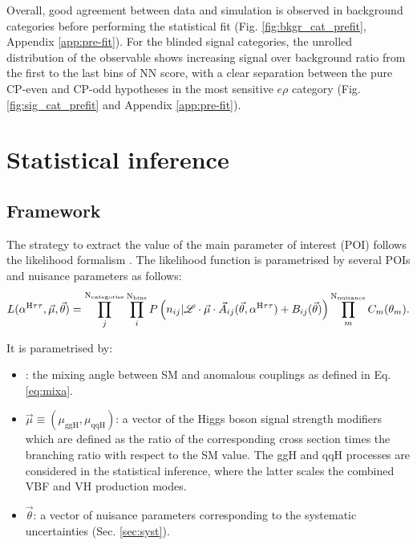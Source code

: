 Overall, good agreement between data and simulation is observed in background categories before performing the statistical fit (Fig. \ref{fig:bkgr_cat_prefit}, Appendix \ref{app:pre-fit}). For the blinded signal categories, the unrolled distribution of the \phicp observable shows increasing signal over background ratio from the first to the last bins of NN score, with a clear separation between the pure CP-even and CP-odd hypotheses in the most sensitive $e\rho$ category (Fig. \ref{fig:sig_cat_prefit} and Appendix \ref{app:pre-fit}).

\section{Statistical inference}\label{sec:stat}
\subsection{Framework}
The strategy to extract the value of the main parameter of interest (POI) \mixa follows the likelihood formalism \cite{Conway:2011in, ATLAS:2011tau, CMS:2014fzn}. The likelihood function is parametrised by several POIs and nuisance parameters as follows: 
\begin{equation}\label{eq:like}
    L(\alpha^{\text{H}\tau\tau}, \vec{\mu}, \vec{\theta}) = \prod_j^{\text{N}_\text{categories}}\prod_i^{\text{N}_\text{bins}} P\left(n_{ij}|\mathcal{L} \cdot \vec{\mu} \cdot \vec{A}_{ij}(\vec{\theta}, \alpha^{\text{H}\tau\tau}) + B_{ij}(\vec{\theta})\right) \prod_m^{\text{N}_\text{nuisance}}C_m(\theta_m).
\end{equation}

It is parametrised by:
\begin{itemize}
    \item \mixa: the mixing angle between SM and anomalous couplings as defined in Eq. \ref{eq:mixa}.
    
    \item $\vec{\mu} \equiv (\mu_\text{ggH}, \mu_\text{qqH})$: a vector of the Higgs boson signal strength modifiers which are defined as the ratio of the corresponding cross section times the \htt branching ratio with respect to the SM value. The ggH and qqH processes are considered in the statistical inference, where the latter scales the combined VBF and VH production modes.
    
    \item $\vec{\theta}$: a vector of nuisance parameters corresponding to the systematic uncertainties (Sec. \ref{sec:syst}).
    
\end{itemize}

